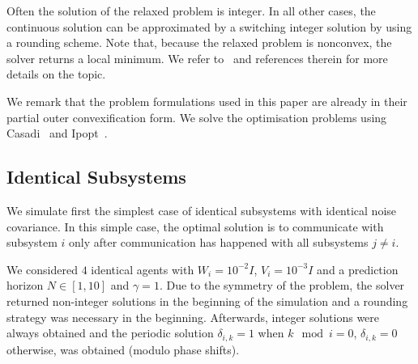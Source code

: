 \documentclass[letterpaper, 10 pt, conference]{ieeeconf}  %
\begin{document}
Often the solution of the relaxed problem is integer. %
In all other cases, the continuous solution can be approximated by a switching integer solution %
by using a rounding scheme.
Note that, because the relaxed problem is nonconvex, the solver returns a local minimum. 
We refer to~\cite{Sager2009,Kirches2010y} and references therein for more details on the topic.

We remark that the problem formulations used in this paper are already in their partial outer convexification form. %
We solve the optimisation problems using Casadi~\cite{Andersson2013b} and Ipopt~\cite{Waechter2006}.


\subsection{Identical Subsystems}
We simulate first the simplest case of identical subsystems with identical noise covariance. In this simple case, the optimal solution is to communicate with subsystem $i$ only after communication has happened with all subsystems $j\neq i$.


We considered $4$ identical agents with $W_i=10^{-2}I$, $V_i= 10^{-3}I$ and a prediction horizon $N\in[1,10]$ and $\gamma=1$. Due to the symmetry of the problem, the solver returned non-integer solutions in the beginning of the simulation and a rounding strategy was necessary in the beginning. Afterwards, integer solutions were always obtained and the periodic solution $\delta_{i,k}=1$ when $k\mod i=0$, $\delta_{i,k}=0$ otherwise, was obtained (modulo phase shifts).
\end{document}
